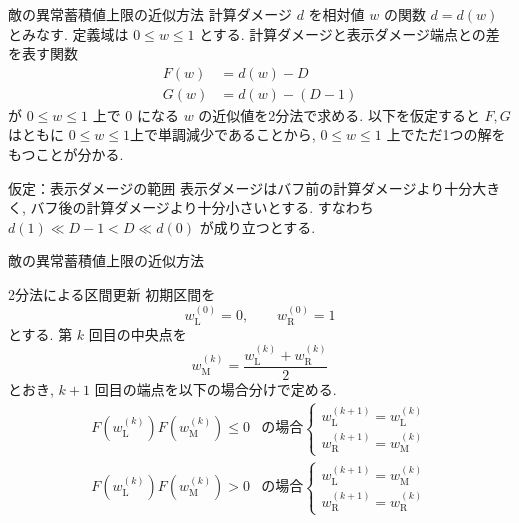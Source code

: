 \documentclass[aspectratio=169]{beamer}
\begin{document}
\begin{frame}{敵の異常蓄積値上限の近似方法}
計算ダメージ $d$ を相対値 $w$ の関数 $d=d(w)$ とみなす.
定義域は $0 \le w \le 1$ とする.
計算ダメージと表示ダメージ端点との差を表す関数
\[
\begin{aligned}
F(w) &=d(w)-D \\
G(w)&=d(w)-(D-1)
\end{aligned}
\]
が $0 \le w \le 1$ 上で $0$ になる $w$ の近似値を2分法で求める.
以下を仮定すると $F, G$ はともに $0 \le w \le 1$上で単調減少であることから, $0 \le w \le 1$ 上でただ1つの解をもつことが分かる.
\begin{block}{仮定：表示ダメージの範囲}
表示ダメージはバフ前の計算ダメージより十分大きく, バフ後の計算ダメージより十分小さいとする. 
すなわち $d(1) \ll D-1<D \ll d(0)$ が成り立つとする. 
\end{block}

\end{frame}

\begin{frame}{敵の異常蓄積値上限の近似方法}
\begin{block}{2分法による区間更新}
\small
初期区間を
\[
w_{\mathrm{L}}^{(0)}=0,
\qquad
w_{\mathrm{R}}^{(0)}=1
\]
とする.
第 $k$ 回目の中央点を
\[
w_{\mathrm{M}}^{(k)}
=
\frac{
w_{\mathrm{L}}^{(k)}+w_{\mathrm{R}}^{(k)}
}{2}
\]
とおき, $k+1$ 回目の端点を以下の場合分けで定める.
\[
\begin{array}{ll}
F(w_{\mathrm{L}}^{(k)})F(w_{\mathrm{M}}^{(k)})\le 0
&
\text{の場合}
\begin{cases}
w_{\mathrm{L}}^{(k+1)} = w_{\mathrm{L}}^{(k)}\\
w_{\mathrm{R}}^{(k+1)} = w_{\mathrm{M}}^{(k)}
\end{cases}
\\[1.2em]
F(w_{\mathrm{L}}^{(k)})F(w_{\mathrm{M}}^{(k)})>0
&
\text{の場合}
\begin{cases}
w_{\mathrm{L}}^{(k+1)} = w_{\mathrm{M}}^{(k)}\\
w_{\mathrm{R}}^{(k+1)} = w_{\mathrm{R}}^{(k)}
\end{cases}
\end{array}
\]
\end{block}

\end{frame}
\end{document}
